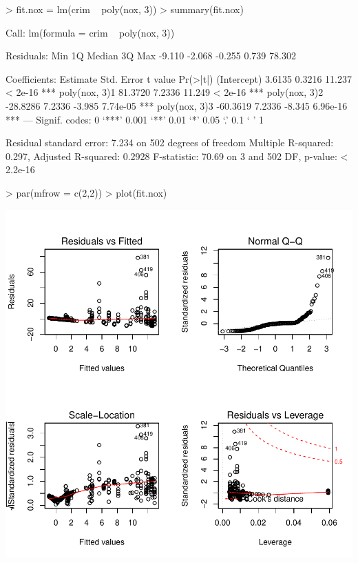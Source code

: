 \documentclass[a4paper]{article}
\begin{document}
\begin{Schunk}
\begin{Sinput}
> fit.nox = lm(crim ~ poly(nox, 3))
> summary(fit.nox)
\end{Sinput}
\begin{Soutput}
Call:
lm(formula = crim ~ poly(nox, 3))

Residuals:
   Min     1Q Median     3Q    Max 
-9.110 -2.068 -0.255  0.739 78.302 

Coefficients:
              Estimate Std. Error t value Pr(>|t|)    
(Intercept)     3.6135     0.3216  11.237  < 2e-16 ***
poly(nox, 3)1  81.3720     7.2336  11.249  < 2e-16 ***
poly(nox, 3)2 -28.8286     7.2336  -3.985 7.74e-05 ***
poly(nox, 3)3 -60.3619     7.2336  -8.345 6.96e-16 ***
---
Signif. codes:  0 ‘***’ 0.001 ‘**’ 0.01 ‘*’ 0.05 ‘.’ 0.1 ‘ ’ 1

Residual standard error: 7.234 on 502 degrees of freedom
Multiple R-squared:  0.297,	Adjusted R-squared:  0.2928 
F-statistic: 70.69 on 3 and 502 DF,  p-value: < 2.2e-16
\end{Soutput}
\begin{Sinput}
> par(mfrow = c(2,2))
> plot(fit.nox)
\end{Sinput}
\end{Schunk}
\includegraphics{mutivariblelm-nox2}
\end{document}
